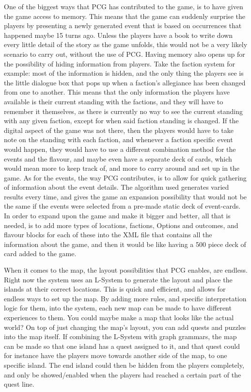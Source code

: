 One of the biggest ways that PCG has contributed to the game, is to have given the game access to memory. This means that the game can suddenly surprise the players by presenting a newly generated event that is based on occurrences that happened maybe 15 turns ago. Unless the players have a book to write down every little detail of the story as the game unfolds, this would not be a very likely scenario to carry out, without the use of PCG. 
Having memory also opens up for the possibility of hiding information from players. Take the faction system for example: most of the information is hidden, and the only thing the players see is the little dialogue box that pops up when a faction's allegiance has been changed from one to another. This means that the only information the players have available is their current standing with the factions, and they will have to remember it themselves, as there is currently no way to see the current standing with any given faction, except for when said faction standing is changed. If the digital aspect of the game was not there, then the players would have to take note on the standing with each faction, and whenever a faction specific event would happen, they would have to use a different combination method for the events and the flavour, and maybe even have a separate deck of cards, which would mean more to keep track of, and more to carry around and set up in the game.
As for the events, the way PCG contributes, is to allow for quick gathering of information about the event details. The algorithm used generates varied results every time, and gives the game an expansion possibility that would not be the same if the events were selected from a pre-made static deck of event-cards. In order to expand upon the game and make it bigger and better, all that is needed, is to add more types of locations, factions, Options and outcomes, and flavour blocks for each of these into the XML file that contains all the information about the game, and then it would be like having a 500 piece deck of card added to the game.

When it comes to the map, the layout possibilities that PCG enables, are endless. Right now the system uses an L-System to generate the layout and place the islands at their correct locations. This is quick and efficient, and allows for endless ways to set up the map. By adding more rules, and specific interpretation logic for them, into the system, each new map can be made to have different experiences to them. You could maybe make a map that looks like the actual world? 
On top of just changing the map's layout, you can add quests and puzzles into the map itself. If combining the L-System with graph grammars, the map can be made so that one island has a quest assigned to it, and that quest could for instance have the players move towards another side of the map, to one specific island. The end island could then be hidden from the players completely, and only be showed/enabled when the players had reached a certain part of the quest line.

